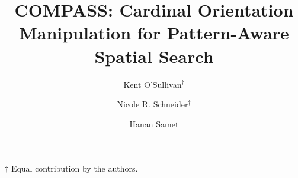 \documentclass[sigconf]{acmart}
\begin{document}


\graphicspath{ {figures/}{auto_commit_fig/}{auto_fig/} }

\newcommand{\latexfile}[1]{}

\newcommand{\pinaforecomment}[4]{\colorbox{#1}{\textcolor{#4}{\parbox{.8\linewidth}{#2: #3}}}}
\newcommand{\osullikomment}[1]{\pinaforecomment{green}{Kent}{#1}{black}}
\newcommand{\nrscomment}[1]{\pinaforecomment{violet}{Nicole}{#1}{white}}

\newcommand\blankpage{%
    \null
    \thispagestyle{empty}%
    \addtocounter{page}{-1}%
    \newpage}



\title{COMPASS: Cardinal Orientation Manipulation for Pattern-Aware Spatial Search\\}

\author{Kent O'Sullivan{$^\dagger$}}

\author{Nicole R. Schneider$^\dagger$}

\author{Hanan Samet}



\begin{abstract}
\latexfile{00_Abstract.tex}
\end{abstract}

\maketitle
$\dagger$ Equal contribution by the authors. 

\latexfile{10_Introduction.tex}
\latexfile{50_Concept_Mapping.tex}
\latexfile{60_Search.tex}
\latexfile{70_Related.tex}
\latexfile{80_Conclusion.tex}


 \label{bibliography}

\blankpage
\blankpage

\latexfile{99_Appendices.tex}
\end{document}
